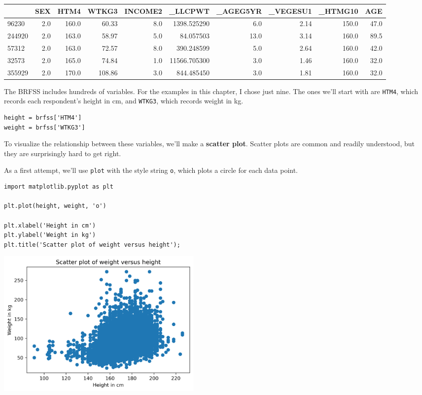 \begin{tabular}{lrrrrrrrrr}
\midrule
{} &  SEX &   HTM4 &   WTKG3 &  INCOME2 &       \_LLCPWT &  \_AGEG5YR &  \_VEGESU1 &  \_HTMG10 &   AGE \\
\midrule
96230  &  2.0 &  160.0 &   60.33 &      8.0 &   1398.525290 &       6.0 &      2.14 &    150.0 &  47.0 \\
244920 &  2.0 &  163.0 &   58.97 &      5.0 &     84.057503 &      13.0 &      3.14 &    160.0 &  89.5 \\
57312  &  2.0 &  163.0 &   72.57 &      8.0 &    390.248599 &       5.0 &      2.64 &    160.0 &  42.0 \\
32573  &  2.0 &  165.0 &   74.84 &      1.0 &  11566.705300 &       3.0 &      1.46 &    160.0 &  32.0 \\
355929 &  2.0 &  170.0 &  108.86 &      3.0 &    844.485450 &       3.0 &      1.81 &    160.0 &  32.0 \\
\midrule
\end{tabular}

The BRFSS includes hundreds of variables. For the examples in this
chapter, I chose just nine. The ones we'll start with are
\passthrough{\lstinline!HTM4!}, which records each respondent's height
in cm, and \passthrough{\lstinline!WTKG3!}, which records weight in kg.

\begin{lstlisting}[]
height = brfss['HTM4']
weight = brfss['WTKG3']
\end{lstlisting}

To visualize the relationship between these variables, we'll make a
\textbf{scatter plot}. Scatter plots are common and readily understood,
but they are surprisingly hard to get right.

As a first attempt, we'll use \passthrough{\lstinline!plot!} with the
style string \passthrough{\lstinline!o!}, which plots a circle for each
data point.

\begin{lstlisting}[]
import matplotlib.pyplot as plt

plt.plot(height, weight, 'o')

plt.xlabel('Height in cm')
plt.ylabel('Weight in kg')
plt.title('Scatter plot of weight versus height');
\end{lstlisting}

\begin{center}
\includegraphics[width=4in]{chapters/09_relationships_files/09_relationships_13_0.png}
\end{center}

